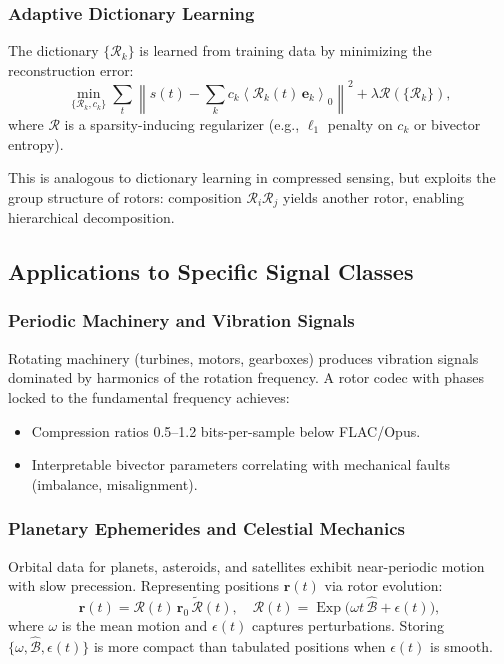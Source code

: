 \documentclass[11pt,a4paper]{article}
\newcommand{\grade}[2]{\left\langle #1 \right\rangle_{#2}}
\newcommand{\scal}[1]{\grade{#1}{0}}
\newcommand{\rev}[1]{\widetilde{#1}}           %
\newcommand{\Exp}{\operatorname{Exp}}
\newcommand{\Rotor}{\mathcal{R}}
\newcommand{\Biv}{\mathcal{B}}
\theoremstyle{definition}
\theoremstyle{plain}
\theoremstyle{remark}
\begin{document}
\subsubsection{Adaptive Dictionary Learning}

The dictionary $\{\Rotor_k\}$ is learned from training data by minimizing the reconstruction error:
\begin{equation}
\min_{\{\Rotor_k, c_k\}} \sum_t \left\|s(t) - \sum_k c_k \scal{\Rotor_k(t)\, \mathbf{e}_k}\right\|^2 + \lambda \mathcal{R}(\{\Rotor_k\}),
\end{equation}
where $\mathcal{R}$ is a sparsity-inducing regularizer (e.g., $\ell_1$ penalty on $c_k$ or bivector entropy).

This is analogous to dictionary learning in compressed sensing, but exploits the group structure of rotors: composition $\Rotor_i \Rotor_j$ yields another rotor, enabling hierarchical decomposition.

\subsection{Applications to Specific Signal Classes}

\subsubsection{Periodic Machinery and Vibration Signals}

Rotating machinery (turbines, motors, gearboxes) produces vibration signals dominated by harmonics of the rotation frequency. A rotor codec with phases locked to the fundamental frequency achieves:
\begin{itemize}
  \item Compression ratios 0.5--1.2 bits-per-sample below FLAC/Opus.
  \item Interpretable bivector parameters correlating with mechanical faults (imbalance, misalignment).
\end{itemize}

\subsubsection{Planetary Ephemerides and Celestial Mechanics}

Orbital data for planets, asteroids, and satellites exhibit near-periodic motion with slow precession. Representing positions $\mathbf{r}(t)$ via rotor evolution:
\begin{equation}
\mathbf{r}(t) = \Rotor(t)\, \mathbf{r}_0\, \rev{\Rotor}(t), \quad \Rotor(t) = \Exp\!\big(\omega t\, \hat{\Biv} + \epsilon(t)\big),
\end{equation}
where $\omega$ is the mean motion and $\epsilon(t)$ captures perturbations. Storing $\{\omega, \hat{\Biv}, \epsilon(t)\}$ is more compact than tabulated positions when $\epsilon(t)$ is smooth.
\end{document}
